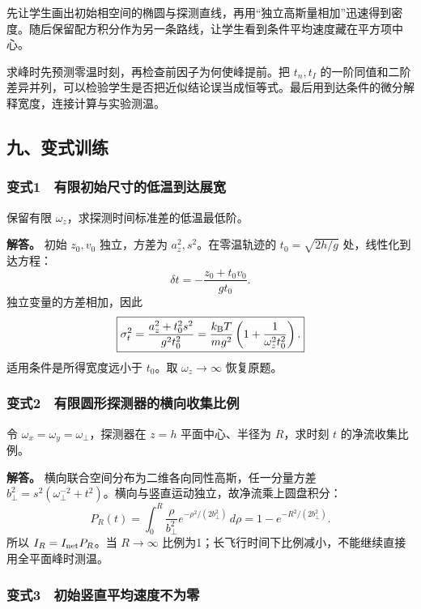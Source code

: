 \documentclass[12pt,a4paper,fontset=fandol]{ctexart}
\begin{document}
先让学生画出初始相空间的椭圆与探测直线，再用``独立高斯量相加''迅速得到密度。随后保留配方积分作为另一条路线，让学生看到条件平均速度藏在平方项中心。

求峰时先预测零温时刻，再检查前因子为何使峰提前。把 \(t_n,t_I\)
的一阶同值和二阶差异并列，可以检验学生是否把近似结论误当成恒等式。最后用到达条件的微分解释宽度，连接计算与实验测温。

\subsection{九、变式训练}\label{ux4e5dux53d8ux5f0fux8badux7ec3}

\subsubsection{变式1　有限初始尺寸的低温到达展宽}\label{ux53d8ux5f0f1-ux6709ux9650ux521dux59cbux5c3aux5bf8ux7684ux4f4eux6e29ux5230ux8fbeux5c55ux5bbd}

保留有限 \(\omega_z\)，求探测时间标准差的低温最低阶。

\textbf{解答。} 初始 \(z_0,v_0\) 独立，方差为
\(a_z^2,s^2\)。在零温轨迹的 \(t_0=\sqrt{2h/g}\) 处，线性化到达方程： \[
\delta t=-\frac{z_0+t_0v_0}{gt_0}.
\] 独立变量的方差相加，因此 \[
\boxed{\sigma_t^2=\frac{a_z^2+t_0^2s^2}{g^2t_0^2}
=\frac{k_{\rm B}T}{mg^2}
\left(1+\frac{1}{\omega_z^2t_0^2}\right).}
\] 适用条件是所得宽度远小于 \(t_0\)。取 \(\omega_z\to\infty\) 恢复原题。

\subsubsection{变式2　有限圆形探测器的横向收集比例}\label{ux53d8ux5f0f2-ux6709ux9650ux5706ux5f62ux63a2ux6d4bux5668ux7684ux6a2aux5411ux6536ux96c6ux6bd4ux4f8b}

令 \(\omega_x=\omega_y=\omega_\perp\)，探测器在 \(z=h\) 平面中心、半径为
\(R\)，求时刻 \(t\) 的净流收集比例。

\textbf{解答。} 横向联合空间分布为二维各向同性高斯，任一分量方差
\(b_\perp^2=s^2(\omega_\perp^{-2}+t^2)\)。横向与竖直运动独立，故净流乘上圆盘积分：
\[
P_R(t)=\int_0^R\frac{\rho}{b_\perp^2}
e^{-\rho^2/(2b_\perp^2)}\,d\rho
=1-e^{-R^2/(2b_\perp^2)}.
\] 所以 \(I_R=I_{\rm net}P_R\)。当 \(R\to\infty\)
比例为1；长飞行时间下比例减小，不能继续直接用全平面峰时测温。

\subsubsection{变式3　初始竖直平均速度不为零}\label{ux53d8ux5f0f3-ux521dux59cbux7ad6ux76f4ux5e73ux5747ux901fux5ea6ux4e0dux4e3aux96f6}
\end{document}
